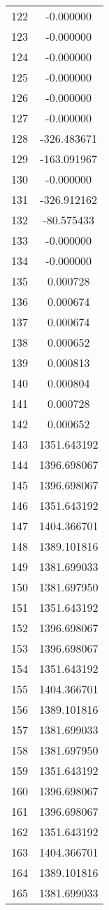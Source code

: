 \documentclass[12pt]{article}
\begin{document}
\begin{longtable}{@{}cc@{}}
122 & -0.000000 \\
123 & -0.000000 \\
124 & -0.000000 \\
125 & -0.000000 \\
126 & -0.000000 \\
127 & -0.000000 \\
128 & -326.483671 \\
129 & -163.091967 \\
130 & -0.000000 \\
131 & -326.912162 \\
132 & -80.575433 \\
133 & -0.000000 \\
134 & -0.000000 \\
135 & 0.000728 \\
136 & 0.000674 \\
137 & 0.000674 \\
138 & 0.000652 \\
139 & 0.000813 \\
140 & 0.000804 \\
141 & 0.000728 \\
142 & 0.000652 \\
143 & 1351.643192 \\
144 & 1396.698067 \\
145 & 1396.698067 \\
146 & 1351.643192 \\
147 & 1404.366701 \\
148 & 1389.101816 \\
149 & 1381.699033 \\
150 & 1381.697950 \\
151 & 1351.643192 \\
152 & 1396.698067 \\
153 & 1396.698067 \\
154 & 1351.643192 \\
155 & 1404.366701 \\
156 & 1389.101816 \\
157 & 1381.699033 \\
158 & 1381.697950 \\
159 & 1351.643192 \\
160 & 1396.698067 \\
161 & 1396.698067 \\
162 & 1351.643192 \\
163 & 1404.366701 \\
164 & 1389.101816 \\
165 & 1381.699033 \\

\end{longtable}
\end{document}
